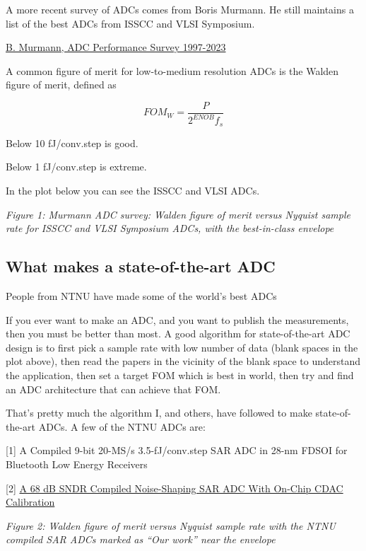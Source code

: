 A more recent survey of ADCs comes from Boris Murmann. He still
maintains a list of the best ADCs from ISSCC and VLSI Symposium.

\href{https://github.com/bmurmann/ADC-survey}{B. Murmann, ADC
Performance Survey 1997-2023}

A common figure of merit for low-to-medium resolution ADCs is the Walden
figure of merit, defined as

\[ FOM_W = \frac{P}{2^{ENOB} f_s}\]

Below 10 fJ/conv.step is good.

Below 1 fJ/conv.step is extreme.

In the plot below you can see the ISSCC and VLSI ADCs.


{
\centering
{}
}

\emph{Figure 1: Murmann ADC survey: Walden figure of merit versus
Nyquist sample rate for ISSCC and VLSI Symposium ADCs, with the
best-in-class envelope}

\subsection{What makes a state-of-the-art
ADC}\label{what-makes-a-state-of-the-art-adc}

People from NTNU have made some of the world's best ADCs

If you ever want to make an ADC, and you want to publish the
measurements, then you must be better than most. A good algorithm for
state-of-the-art ADC design is to first pick a sample rate with low
number of data (blank spaces in the plot above), then read the papers in
the vicinity of the blank space to understand the application, then set
a target FOM which is best in world, then try and find an ADC
architecture that can achieve that FOM.

That's pretty much the algorithm I, and others, have followed to make
state-of-the-art ADCs. A few of the NTNU ADCs are:

{[}1{]} A Compiled 9-bit 20-MS/s 3.5-fJ/conv.step SAR ADC in 28-nm FDSOI
for Bluetooth Low Energy Receivers 

{[}2{]} \href{https://ieeexplore.ieee.org/document/9056925}{A 68 dB SNDR
Compiled Noise-Shaping SAR ADC With On-Chip CDAC Calibration}


{
\centering
{}
}

\emph{Figure 2: Walden figure of merit versus Nyquist sample rate with
the NTNU compiled SAR ADCs marked as ``Our work'' near the envelope}


